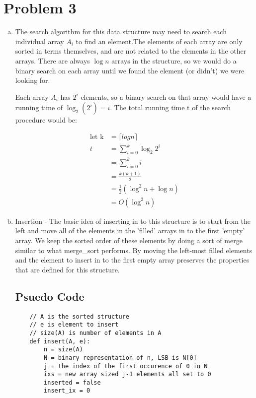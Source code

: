 \documentclass[a4paper,12pt]{article}
\begin{document}
\section*{Problem 3}

\begin{enumerate}[a)]

\item The search algorithm for this data structure may need to search
  each individual array \(A_i\) to find an element.The elements of
  each array are only sorted in terms themselves, and are not related
  to the elements in the other arrays. There are always \(\log n\)
  arrays in the structure, so we would do a binary search on each
  array until we found the element (or didn't) we were looking for.

    \noindent Each array \(A_i\) has \(2^i\) elements, so a binary
    search on that array would have a running time of \(\log_2(2^i) =
    i \). The total running time t of the search procedure would be:

    \begin{align*}
      \text{let k}& = \lceil log n \rceil\\
        t& = \sum_{i=0}^k \log_2 2^i\\
        & = \sum_{i=0}^k i\\
        & = \frac{k(k+1)}{2}\\
        & = \frac{1}{2}\left(\log^2 n + \log n\right) \\
        & = O(\log^2 n)
    \end{align*}

  \item Insertion - The basic idea of inserting in to this structure
    is to start from the left and move all of the elements in the
    'filled' arrays in to the first 'empty' array. We keep the sorted
    order of these elements by doing a sort of merge similar to what
    merge\_sort performs. By moving the left-most filled elements and
    the element to insert in to the first empty array preserves the
    properties that are defined for this structure.

  \subsection*{Psuedo Code}

  \begin{verbatim}
    // A is the sorted structure 
    // e is element to insert
    // size(A) is number of elements in A
    def insert(A, e):
        n = size(A)
        N = binary representation of n, LSB is N[0]
        j = the index of the first occurence of 0 in N
        ixs = new array sized j-1 elements all set to 0 
        inserted = false
        insert_ix = 0 


\end{verbatim}
\end{enumerate}
\end{document}
